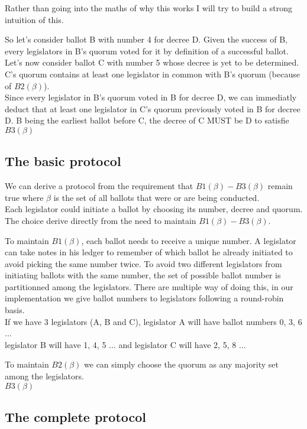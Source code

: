 \documentclass{article}
\begin{document}
Rather than going into the maths of why this works I will try to build a strong intuition of this.

So let's consider ballot B with number 4 for decree D. Given the success of B, every legislators in B's quorum voted for it by definition of a successful ballot.\\
Let's now consider ballot C with number 5 whose decree is yet to be determined. C's quorum contains at least one legislator in common with B's quorum (because of $B2(\beta)$).\\
Since every legislator in B's quorum voted in B for decree D, we can immediatly deduct that at least one legislator in C's quorum previously voted in B for decree D. B being the earliest ballot before C, the decree of C MUST be D to satisfie $B3(\beta)$

\subsection{The basic protocol}
We can derive a protocol from the requirement that $B1(\beta)-B3(\beta)$ remain true where $\beta$ is the set of all ballots that were or are being conducted.\\
Each legislator could initiate a ballot by choosing its number, decree and quorum. The choice derive directly from the need to maintain $B1(\beta)-B3(\beta)$.

To maintain $B1(\beta)$, each ballot needs to receive a unique number. A legislator can take notes in his ledger to remember of which ballot he already initiated to avoid picking the same number twice. To avoid two different legislators from initiating ballots with the same number, the set of possible ballot number is partitionned among the legislators. There are multiple way of doing this, in our implementation we give ballot numbers to legislators following a round-robin basis.\\
If we have 3 legislators (A, B and C), legislator A will have ballot numbers 0, 3, 6 ...\\
legislator B will have 1, 4, 5 ... and legislator C will have 2, 5, 8 ...

To maintain $B2(\beta)$ we can simply choose the quorum as any majority set among the legislators.\\

$B3(\beta)$

\subsection{The complete protocol}
\end{document}
